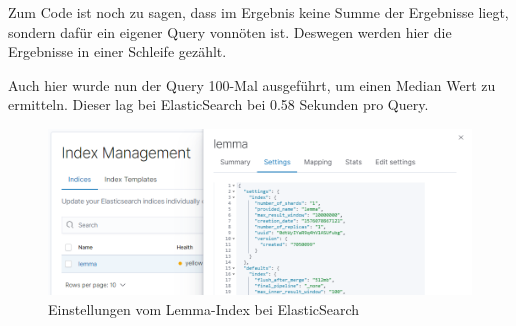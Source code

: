 Zum Code ist noch zu sagen, dass im Ergebnis keine Summe der Ergebnisse liegt, sondern dafür ein eigener Query vonnöten ist. Deswegen werden hier die Ergebnisse in einer Schleife gezählt.

Auch hier wurde nun der Query 100-Mal ausgeführt, um einen Median Wert zu ermitteln. Dieser lag bei ElasticSearch bei 0.58 Sekunden pro Query.

\begin{figure}
	\centering
	\includegraphics[width=1\linewidth]{images/elastic_index_settings.png}
	\caption{Einstellungen vom Lemma-Index bei ElasticSearch}
	\label{img:elasticIndexSettings}
\end{figure}


